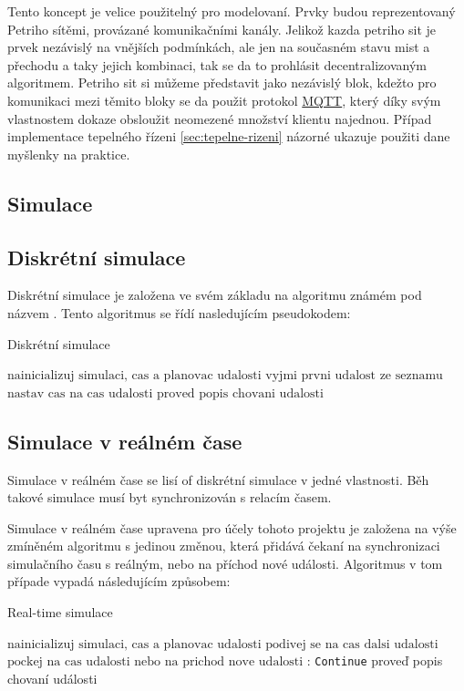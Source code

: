 Tento koncept je velice použitelný pro modelovaní. Prvky budou reprezentovaný Petriho sítěmi, provázané komunikačními kanály. Jelikož kazda petriho sit je prvek nezávislý na vnějších podmínkách, ale jen na současném stavu mist a přechodu a taky jejich kombinaci, tak se da to prohlásit decentralizovaným algoritmem. Petriho sit si můžeme představit jako nezávislý blok, kdežto pro komunikaci mezi těmito bloky se da použit protokol \href{http://docs.oasis-open.org/mqtt/mqtt/v3.1.1/csprd02/mqtt-v3.1.1-csprd02.html}{MQTT}, který díky svým vlastnostem dokaze obsloužit neomezené množství klientu najednou. Případ implementace tepelného řízeni \ref{sec:tepelne-rizeni} názorné ukazuje použiti dane myšlenky na praktice.

\subsection{Simulace}
\subsection{Diskrétní simulace}
Diskrétní simulace je založena ve svém základu na algoritmu známém pod názvem . Tento algoritmus se řídí nasledujícím pseudokodem:
\begin{algorithm}
  \caption{Diskrétní simulace}\label{euclid}
  \begin{algorithmic}[1]
  \State $\text{nainicializuj simulaci, cas a planovac udalosti}$
  \State $\text{vyjmi prvni udalost ze seznamu}$
    \Return
  \EndIf
  \State $\text{nastav cas na cas udalosti}$
  \State $\text{proved popis chovani udalosti}$
  \EndWhile
  \end{algorithmic}
  \end{algorithm}
\subsection{Simulace v reálném čase}
Simulace v reálném čase se lisí of diskrétní simulace v jedné vlastnosti. Běh takové simulace musí byt synchronizován s relacím časem. 

Simulace v reálném čase upravena pro účely tohoto projektu je založena na výše zmíněném algoritmu  s jedinou změnou, která přidává čekaní na synchronizaci simulačního času s reálným, nebo na příchod nové události. Algoritmus v tom případe vypadá následujícím způsobem:

\begin{algorithm}
\caption{Real-time simulace}\label{euclid}
\begin{algorithmic}[1]
\State $\text{nainicializuj simulaci, cas a planovac udalosti}$
\State $\text{podivej se na cas dalsi udalosti}$
\Return
\EndIf
\State $\text{pockej na cas udalosti nebo na prichod nove udalosti}$
:
    \State \texttt{Continue}
\EndIf
\State proveď popis chovaní události
\EndWhile
\end{algorithmic}
\end{algorithm}

